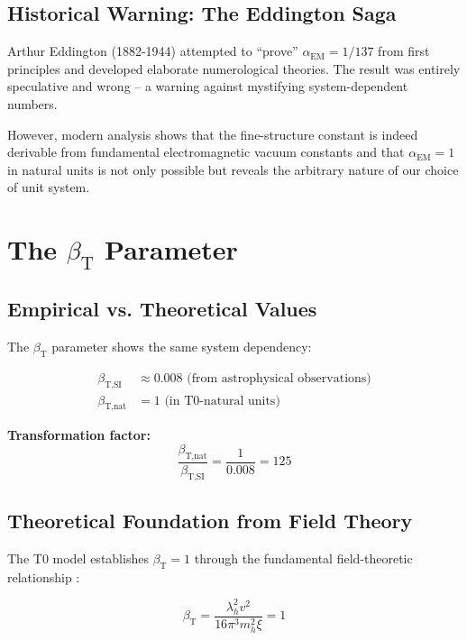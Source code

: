 \documentclass[12pt,a4paper]{article}
\newcommand{\xipar}{\xi}
\newcommand{\lambdah}{\lambda_h}
\newcommand{\pichar}{\pi}
\newcommand{\betaTSI}{\beta_{\text{T,SI}}}
\newcommand{\betaTnat}{\beta_{\text{T,nat}}}
\begin{document}
\subsection{Historical Warning: The Eddington Saga}
\label{subsec:eddington_warning}

Arthur Eddington (1882-1944) attempted to ``prove'' $\alpha_{\text{EM}} = 1/137$ from first principles and developed elaborate numerological theories. The result was entirely speculative and wrong -- a warning against mystifying system-dependent numbers.

However, modern analysis shows that the fine-structure constant is indeed derivable from fundamental electromagnetic vacuum constants and that $\alpha_{\text{EM}} = 1$ in natural units is not only possible but reveals the arbitrary nature of our choice of unit system.
	\section{The $\beta_{\text{T}}$ Parameter}
	\label{sec:beta_t}
	
	\subsection{Empirical vs. Theoretical Values}
	\label{subsec:beta_empirical_theoretical}
	
	The $\beta_{\text{T}}$ parameter shows the same system dependency:
	
	\begin{align}
		\betaTSI &\approx 0.008 \text{ (from astrophysical observations)} \\
		\betaTnat &= 1 \text{ (in T0-natural units)}
	\end{align}
	
	\textbf{Transformation factor:}
	$$\frac{\betaTnat}{\betaTSI} = \frac{1}{0.008} = 125$$
	
	\subsection{Theoretical Foundation from Field Theory}
	\label{subsec:beta_field_theory}
	
	The T0 model establishes $\beta_{\text{T}} = 1$ through the fundamental field-theoretic relationship \cite{pascher_derivation_beta_2025}:
	
	\begin{equation}
		\beta_{\text{T}} = \frac{\lambdah^2 v^2}{16\pichar^3 m_h^2 \xipar} = 1
		\label{eq:beta_t_field_theory}
	\end{equation}
	
\end{document}
